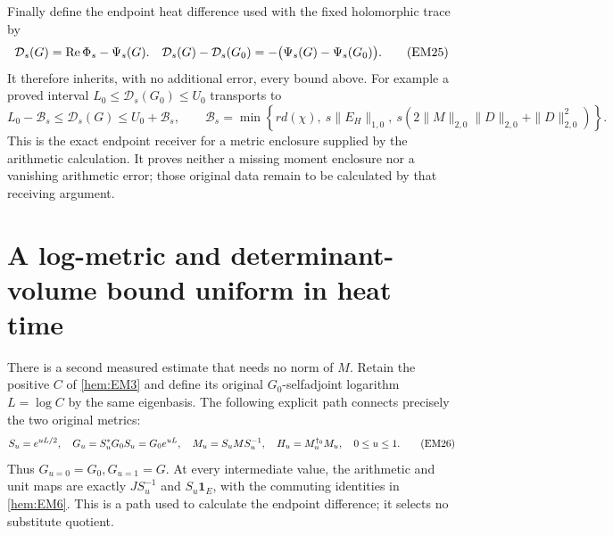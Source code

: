 Finally define the endpoint heat difference used with the fixed
holomorphic trace by
\begin{equation}
 \mathcal D_s(G)=\operatorname{Re}\Phi_s-\Psi_s(G).
 \quad
 \mathcal D_s(G)-\mathcal D_s(G_0)
     =-\bigl(\Psi_s(G)-\Psi_s(G_0)\bigr).
 \tag{EM25}\label{hem:EM25}
\end{equation}
It therefore inherits, with no additional error, every bound above.
For example a proved interval
\(L_0\le\mathcal D_s(G_0)\le U_0\) transports to
\[
 L_0-\mathcal B_s\le\mathcal D_s(G)\le U_0+\mathcal B_s,
 \qquad
 \mathcal B_s=\min\!\left\{
 r d(\chi),\
 s\|E_H\|_{1,0},\
 s(2\|M\|_{2,0}\|D\|_{2,0}+\|D\|_{2,0}^2)
 \right\}.
\]
This is the exact endpoint receiver for a metric enclosure supplied by
the arithmetic calculation. It proves neither a missing moment enclosure
nor a vanishing arithmetic error; those original data remain to be
calculated by that receiving argument.

\section{A log-metric and determinant-volume bound uniform in heat time}

There is a second measured estimate that needs no norm of \(M\).
Retain the positive \(C\) of \eqref{hem:EM3} and define its original
\(G_0\)-selfadjoint logarithm \(L=\log C\) by the same eigenbasis.
The following explicit path connects precisely the two original metrics:
\begin{equation}
 S_u=e^{uL/2},\quad G_u=S_u^*G_0S_u=G_0e^{uL},\quad
 M_u=S_uMS_u^{-1},\quad H_u=M_u^{\dagger_0}M_u,\quad0\le u\le1.
 \tag{EM26}\label{hem:EM26}
\end{equation}
Thus \(G_{u=0}=G_0,G_{u=1}=G\). At every intermediate value, the
arithmetic and unit maps are exactly \(JS_u^{-1}\) and \(S_u\mathbf1_E\),
with the commuting identities in \eqref{hem:EM6}. This is a path used to
calculate the endpoint difference; it selects no substitute quotient.

